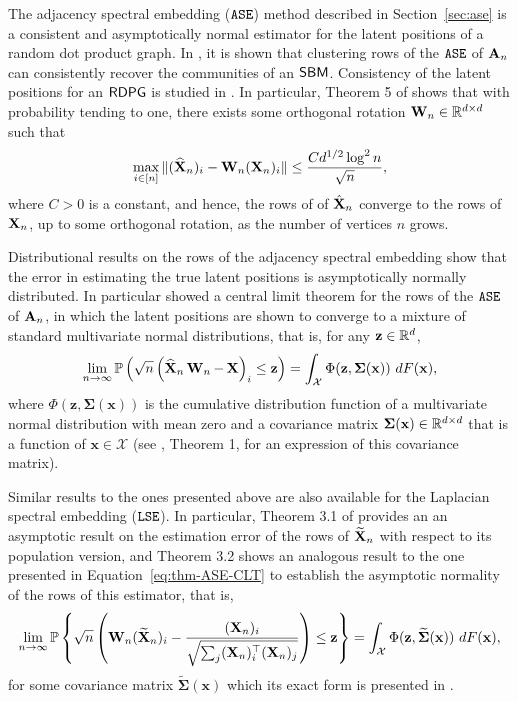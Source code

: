 The adjacency spectral embedding ($\operatorname{\mathtt{ASE}}$) method described in Section~\ref{sec:ase} is a consistent and asymptotically normal estimator for the latent positions of a random dot product graph. In \cite{sussman2012consistent}, it is shown that clustering rows of the $\operatorname{\mathtt{ASE}}$ of $\operatorname{\mathbf{A}}_n$ can consistently recover the communities of an $\operatorname{\mathsf{SBM}}$. Consistency of the latent positions for an $\operatorname{\mathsf{RDPG}}$ is studied in  \cite{Sussman2014-zq,Lyzinski2014-pe,Lyzinski2017-cq}. In particular, Theorem 5 of  \cite{Lyzinski2017-cq} shows that with probability tending to one, there exists some orthogonal rotation $\operatorname{\mathbf{W}}_n\in\mathbb{R}^{d\times d}$ such that 
\begin{equation*}
    \max_{i\in[n]}\|(\widehat{\operatorname{\mathbf{X}}}_n)_i - \operatorname{\mathbf{W}}_n(\operatorname{\mathbf{X}}_n)_i\| \leq \frac{Cd^{1/2}\log^2 n}{\sqrt{n}}, \label{eq:thm-ASE-const}
\end{equation*}
where $C>0$ is a constant, and hence, the rows of of $\hat{\operatorname{\mathbf{X}}}_n$ converge to the rows of $\operatorname{\mathbf{X}}_n$, up to some orthogonal rotation, as the number of vertices $n$ grows. 


Distributional results on the rows of the adjacency spectral embedding show that the error in estimating the true latent positions is asymptotically normally distributed. In particular \cite{Athreya2016} showed  a central limit theorem for the rows of the $\operatorname{\mathtt{ASE}}$ of $\operatorname{\mathbf{A}}_n$, in which the latent positions are shown to converge to a mixture of standard multivariate normal distributions, that is, for any $\mathbf{z}\in\mathbb{R}^{d}$,
\begin{equation}
   \lim_{n\rightarrow\infty} \mathbb{P}\left(\sqrt{n}\left(\widehat{\operatorname{\mathbf{X}}}_n\operatorname{\mathbf{W}}_n - \operatorname{\mathbf{X}}\right)_i\leq \mathbf{z} \right) = \int_{\mathcal{X}}\Phi(\mathbf{z}, \mathbf{\Sigma}(\mathbf{x}))\  dF(\mathbf{x}),\label{eq:thm-ASE-CLT}
\end{equation}
where $\Phi(\mathbf{z}, \mathbf{\Sigma}(\mathbf{x}))$ is the cumulative distribution function of a multivariate normal distribution with mean zero and a covariance matrix $\mathbf{\Sigma}(\mathbf{x})\in\mathbb{R}^{d\times d}$ that is a function of $\mathbf{x}\in\mathcal{X}$ (see \cite{Athreya2016}, Theorem 1, for an expression of this covariance matrix). 

Similar results to the ones presented above are also available for the Laplacian spectral embedding ($\operatorname{\mathtt{LSE}}$). In particular, Theorem 3.1 of \cite{tang2018limit} provides an an asymptotic result on the estimation error of the rows of $\widetilde{\operatorname{\mathbf{X}}}_n$  with respect to its population version, and Theorem 3.2 shows an analogous result to the one presented in Equation~\eqref{eq:thm-ASE-CLT} to establish the asymptotic normality of the rows of this estimator, that is,
\begin{equation*}
   \lim_{n\rightarrow\infty} \mathbb{P}\left\{\sqrt{n}\left(\operatorname{\mathbf{W}}_n(\widetilde{\operatorname{\mathbf{X}}}_n)_i - \frac{(\operatorname{\mathbf{X}}_n)_i}{\sqrt{\sum_{j}(\operatorname{\mathbf{X}}_n)_i^\top (\operatorname{\mathbf{X}}_n)_j }} \right)\leq \mathbf{z}\right\}  = \int_{\mathcal{X}}\Phi(\mathbf{z}, \widetilde{\mathbf{\Sigma}}(\mathbf{x}))\  dF(\mathbf{x}),\label{eq:thm-LSE-CLT}
\end{equation*}
for some covariance matrix $\widetilde{\mathbf{\Sigma}}(\mathbf{x})$ which its exact form is presented in \cite{tang2018limit}.

